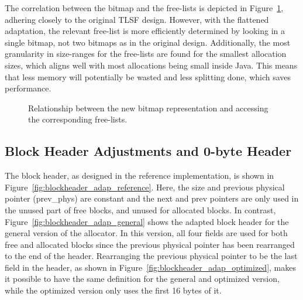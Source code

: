 The correlation between the bitmap and the free-lists is depicted in Figure~\ref{fig:bitmap_relationship}, adhering closely to the original TLSF design. However, with the flattened adaptation, the relevant free-list is more efficiently determined by looking in a single bitmap, not two bitmaps as in the original design. Additionally, the most granularity in size-ranges for the free-lists are found for the smallest allocation sizes, which aligns well with most allocations being small inside Java. This means that less memory will potentially be wasted and less splitting done, which saves performance.

\begin{figure}[H]
    \centering
    \vspace*{0.2cm}
    
    \vspace*{1mm}
    \caption{Relationship between the new bitmap representation and accessing the corresponding free-lists.}
    \label{fig:bitmap_relationship}
\end{figure}

\subsection{Block Header Adjustments and 0-byte Header}
\label{sec:adaptations_impl:0-byte-header}

The block header, as designed in the reference implementation, is shown in Figure~\ref{fig:blockheader_adap_reference}. Here, the size and previous physical pointer (prev\_phys) are constant and the next and prev pointers are only used in the unused part of free blocks, and unused for allocated blocks. In contrast, Figure~\ref{fig:blockheader_adap_general} shows the adapted block header for the general version of the allocator. In this version, all four fields are used for both free and allocated blocks since the previous physical pointer has been rearranged to the end of the header. Rearranging the previous physical pointer to be the last field in the header, as shown in Figure~\ref{fig:blockheader_adap_optimized}, makes it possible to have the same definition for the general and optimized version, while the optimized version only uses the first 16 bytes of it.

